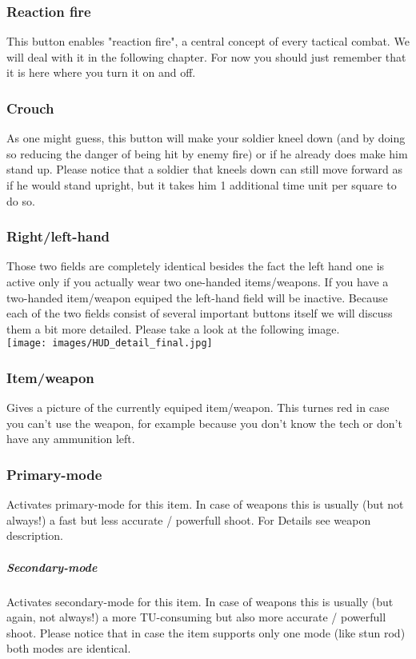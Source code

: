 \subsubsection{Reaction fire}
This button enables "reaction fire", a central concept of every tactical combat. We will deal with it in the following chapter. For now you should just remember that it is here where you turn it on and off.
\subsubsection{Crouch}
As one might guess, this button will make your soldier kneel down (and by doing so reducing the danger of being hit by enemy fire) or if he already does make him stand up. Please notice that a soldier that kneels down can still move forward as if he would stand upright, but it takes him 1 additional time unit per square to do so.
\subsubsection{Right/left-hand}
Those two fields are completely identical besides the fact the left hand one is active only if you actually wear two one-handed items/weapons. If you have a two-handed item/weapon equiped the left-hand field will be inactive. Because each of the two fields consist of several important buttons itself we will discuss them a bit more detailed. Please take a look at the following image.\\
\texttt{[image: images/HUD\_detail\_final.jpg]}
\subsubsection{Item/weapon}
Gives a picture of the currently equiped item/weapon. This turnes red in case you can't use the weapon, for example because you don't know the tech or don't have any ammunition left.
\subsubsection{Primary-mode}
Activates primary-mode for this item. In case of weapons this is usually (but not always!) a fast but less accurate / powerfull shoot. For Details see weapon description.
\subparagraph{Secondary-mode}
Activates secondary-mode for this item. In case of weapons this is usually (but again, not always!) a more TU-consuming but also more accurate / powerfull shoot. Please notice that in case the item supports only one mode (like stun rod) both modes are identical.
